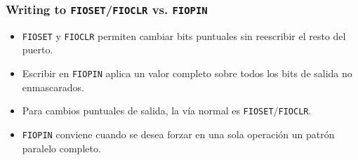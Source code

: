 \subsubsection{Writing to \texttt{FIOSET}/\texttt{FIOCLR} vs. \texttt{FIOPIN}}
\begin{itemize}
  \item \texttt{FIOSET} y \texttt{FIOCLR} permiten cambiar bits puntuales sin reescribir el resto del puerto.
  \item Escribir en \texttt{FIOPIN} aplica un valor completo sobre todos los bits de salida no enmascarados.
  \item Para cambios puntuales de salida, la vía normal es \texttt{FIOSET}/\texttt{FIOCLR}.
  \item \texttt{FIOPIN} conviene cuando se desea forzar en una sola operación un patrón paralelo completo.
\end{itemize}
